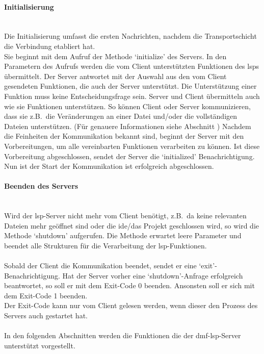 \documentclass[./einleitung.tex]{subfiles}
\begin{document}
    \paragraph{Initialisierung}\mbox{}\\
    Die Initialisierung umfasst die ersten Nachrichten, nachdem die Transportschicht die Verbindung etabliert hat. \\
    Sie beginnt mit dem Aufruf der Methode `initialize' des Servers.
    In den Parametern des Aufrufs werden die vom Client unterstützten Funktionen des \acrshort{lsp}s übermittelt.
    Der Server antwortet mit der Auswahl aus den vom Client gesendeten Funktionen, die auch der Server unterstützt.
    Die Unterstützung einer Funktion muss keine Entscheidungsfrage sein.
    Server und Client übermitteln auch wie sie Funktionen unterstützen.
    So können Client oder Server kommunizieren, dass sie z.B.\ die Veränderungen an einer Datei und/oder die vollständigen Dateien unterstützen.
    (Für genauere Informationen siehe Abschnitt )
    \newline
    \newline
    Nachdem die Feinheiten der Kommunikation bekannt sind, beginnt der Server mit den Vorbereitungen, um alle vereinbarten Funktionen verarbeiten zu können.
    Ist diese Vorbereitung abgeschlossen, sendet der Server die `initialized' Benachrichtigung.
    Nun ist der Start der Kommunikation ist erfolgreich abgeschlossen.


    \paragraph{Beenden des Servers}\mbox{}\\
    Wird der \acrshort{lsp}-Server nicht mehr vom Client benötigt, z.B.\ da keine relevanten Dateien mehr geöffnet sind oder die \acrshort{ide}/das Projekt geschlossen wird, so wird die Methode `shutdown' aufgerufen.
    Die Methode erwartet leere Parameter und beendet alle Strukturen für die Verarbeitung der \acrshort{lsp}-Funktionen.
    \\\\
    Sobald der Client die Kommunikation beendet, sendet er eine `exit'-Benachrichtigung.
    Hat der Server vorher eine `shutdown'-Anfrage erfolgreich beantwortet, so soll er mit dem Exit-Code 0 beenden.
    Ansonsten soll er sich mit dem Exit-Code 1 beenden.\\
    Der Exit-Code kann nur vom Client gelesen werden, wenn dieser den Prozess des Servers auch gestartet hat.
    \\\\
    In den folgenden Abschnitten werden die Funktionen die der \acrshort{dmf}-\acrshort{lsp}-Server unterstützt vorgestellt.
\end{document}
